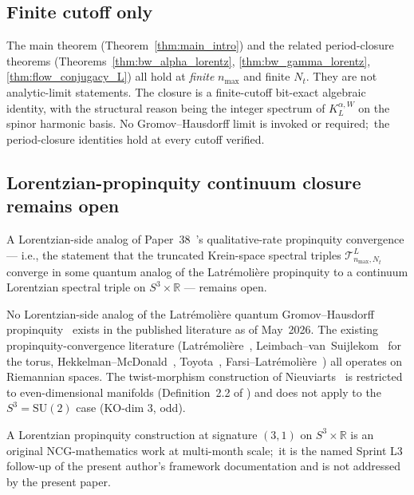 \documentclass[11pt,a4paper]{article}
\theoremstyle{plain}
\theoremstyle{definition}
\newcommand{\nmax}{n_{\max}}
\newcommand{\Nt}{N_t}
\newcommand{\sthree}{S^{3}}
\newcommand{\Tcal}{\mathcal{T}}
\newcommand{\R}{\mathbb{R}}
\newcommand{\SU}{\mathrm{SU}}
\newcommand{\KL}{K_{L}}
\begin{document}
\subsection{Finite cutoff only}\label{sec:scope_finite_cutoff}

The main theorem (Theorem~\ref{thm:main_intro}) and the related
period-closure theorems
(Theorems~\ref{thm:bw_alpha_lorentz}, \ref{thm:bw_gamma_lorentz},
\ref{thm:flow_conjugacy_L}) all hold at \emph{finite} $\nmax$ and
finite $\Nt$. They are not analytic-limit statements. The closure is a
finite-cutoff bit-exact algebraic identity, with the structural reason
being the integer spectrum of $\KL^{\alpha, W}$ on the spinor harmonic
basis. No Gromov--Hausdorff limit is invoked or required;\ the
period-closure identities hold at every cutoff verified.

\subsection{Lorentzian-propinquity continuum closure remains open}
\label{sec:scope_lorentzian_propinquity}

A Lorentzian-side analog of Paper~38~\cite{paper38}'s qualitative-rate
propinquity convergence — i.e., the statement that the truncated
Krein-space spectral triples $\Tcal_{\nmax, \Nt}^L$ converge in some
quantum analog of the Latr\'emoli\`ere propinquity to a continuum
Lorentzian spectral triple on $\sthree \times \R$ — remains open.

No Lorentzian-side analog of the Latr\'emoli\`ere quantum
Gromov--Hausdorff propinquity~\cite{latremoliere2018,
latremoliere_metric_st_2017} exists in the published
literature as of May~2026. The existing propinquity-convergence
literature (Latr\'emoli\`ere~\cite{latremoliere2018,
latremoliere_metric_st_2017}, Leimbach--van~Suijlekom~\cite{leimbach_vs2024}
for the torus, Hekkelman--McDonald~\cite{hekkelman_mcdonald2024,
hekkelman_mcdonald2024b}, Toyota~\cite{toyota2023},
Farsi--Latr\'emoli\`ere~\cite{farsi_latremoliere2024,
farsi_latremoliere2025}) all operates on Riemannian spaces. The
twist-morphism construction of
Nieuviarts~\cite{nieuviarts2025a, nieuviarts2024,
nieuviarts2025b_proceedings} is restricted to even-dimensional
manifolds (Definition~2.2 of \cite{nieuviarts2025a}) and does not apply
to the $\sthree = \SU(2)$ case (KO-dim 3, odd).

A Lorentzian propinquity construction at signature $(3, 1)$ on
$\sthree \times \R$ is an original NCG-mathematics work at multi-month
scale;\ it is the named Sprint L3 follow-up of the present author's
framework documentation and is not addressed by the present paper.
\end{document}
